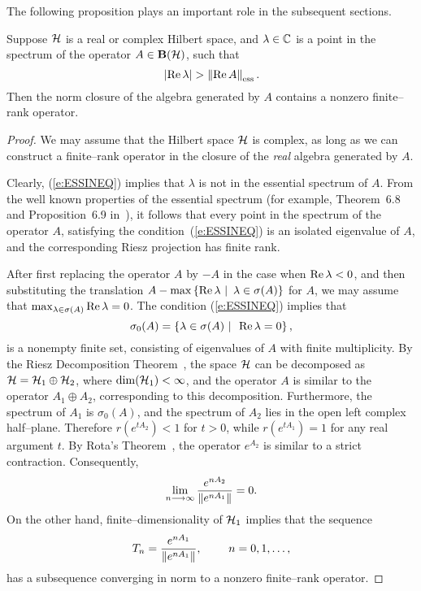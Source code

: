 The following proposition plays an important role in the
subsequent sections.

\begin{prop}\label{p:ESSPECT}
Suppose ${\cal H}$ is a real or complex Hilbert space, and
$\lambda\in\mathbb C$ is a point in the spectrum of the operator
$A\in\mathbf B(\cal H)$, such that
\begin{equation} \label{e:ESSINEQ}
 \abs{\RE\lambda} > \essnorm{\RE{}A}.
\end{equation}
Then the norm closure of the algebra generated by $A$ contains
a nonzero finite--rank operator.
\end{prop}

\begin{proof}
We may assume that the Hilbert space ${\cal H}$ is complex, as long
as we can construct a finite--rank operator in the closure of
the {\em real} algebra generated by $A$.

Clearly, (\ref{e:ESSINEQ}) implies that $\lambda$ is not in the
essential spectrum of $A$. From the well known properties of
the essential spectrum (for example, Theorem~6.8 and
Proposition~6.9 in~\cite[p.~366]{Con90}), it follows that every
point in the spectrum of the operator $A$, satisfying the
condition~(\ref{e:ESSINEQ}) is an isolated eigenvalue of $A$,
and the corresponding Riesz projection has finite rank.

\goodbreak

After first replacing the operator $A$ by $-A$ in the case when
$\operatorname{Re}\lambda<0$, and then substituting the translation
$A-\max\left\{\operatorname{Re}\lambda\,\,|\,\,\,\lambda\in\sigma(A)\right\}$ for $A$,
we may assume that $\max_{\lambda\in\sigma(A)}{\operatorname{Re}\lambda}=0$.
The condition (\ref{e:ESSINEQ}) implies that
\[ \sigma_0(A)=\left\{\lambda\in\sigma(A)\,\,|\,\,\,\operatorname{Re}\lambda=0\right\}, \]
is a nonempty finite set, consisting of eigenvalues of $A$ with
finite multiplicity. By the Riesz Decomposition
Theorem~\cite[p.~31]{RR73}, the space ${\cal H}$ can be decomposed as
${\cal H}={\cal H}_1\oplus{\cal H}_2$, where $\dim({\cal H}_1)<\infty$, and the
operator $A$ is similar to the operator $A_1\oplus{}A_2$,
corresponding to this decomposition. Furthermore, the spectrum
of $A_1$ is $\sigma_0(A)$, and the spectrum of $A_2$ lies in
the open left complex half--plane. Therefore $r(e^{t{}A_2})<1$
for $t>0$, while $r(e^{t{}A_1})=1$ for any real argument $t$.
By Rota's Theorem~\cite[p.~136]{Pau86}, the operator $e^{A_2}$
is similar to a strict contraction. Consequently,
\[ \lim_{n\longrightarrow\infty}\frac{ e^{n{}A_2} }{ \left\Vert e^{n{}A_1}\right\Vert }=0. \]
On the other hand, finite--dimensionality of ${\cal H}_1$ implies
that the sequence
\[ T_n = \frac{e^{n{}A_1}}{\left\Vert e^{n{}A_1}\right\Vert}, ~
         \qquad n=0,1,\ldots, \]
has a subsequence converging in norm to a nonzero finite--rank
operator.
\end{proof}

